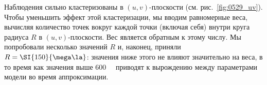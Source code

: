 Наблюдения сильно кластеризованы в $(u, v)$-плоскости (см. рис.~\ref{fig:0529_uv}). Чтобы уменьшить
эффект этой кластеризации, мы вводим равномерные веса, вычисляя количество точек вокруг каждой точки
(включая себя) внутри круга радиуса $R$ в $(u, v)$-плоскости. Вес является обратным к этому числу.
Мы попробовали несколько значений $R$ и, наконец, приняли $R = \SI{150}{\mega\la}$: значения ниже
этого не влияют значительно на веса, в то время как значения выше \SI{600}{\mega\la} приводят к
вырождению между параметрами модели во время аппроксимации.
